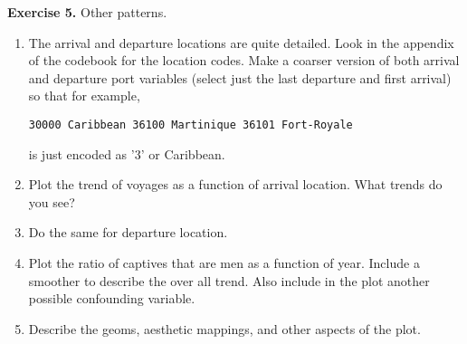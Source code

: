 \documentclass[11pt]{article}
\begin{document}
    \textbf{Exercise 5.} Other patterns.

\begin{enumerate}
\def\labelenumi{\arabic{enumi}.}
\item
  The arrival and departure locations are quite detailed. Look in the
  appendix of the codebook for the location codes. Make a coarser
  version of both arrival and departure port variables (select just the
  last departure and first arrival) so that for example,

\begin{verbatim}
30000 Caribbean 36100 Martinique 36101 Fort-Royale
\end{verbatim}

  is just encoded as '3' or Caribbean.
\item
  Plot the trend of voyages as a function of arrival location. What
  trends do you see?
\item
  Do the same for departure location.
\item
  Plot the ratio of captives that are men as a function of year. Include
  a smoother to describe the over all trend. Also include in the plot
  another possible confounding variable.
\item
  Describe the geoms, aesthetic mappings, and other aspects of the plot.
\end{enumerate}
\end{document}
